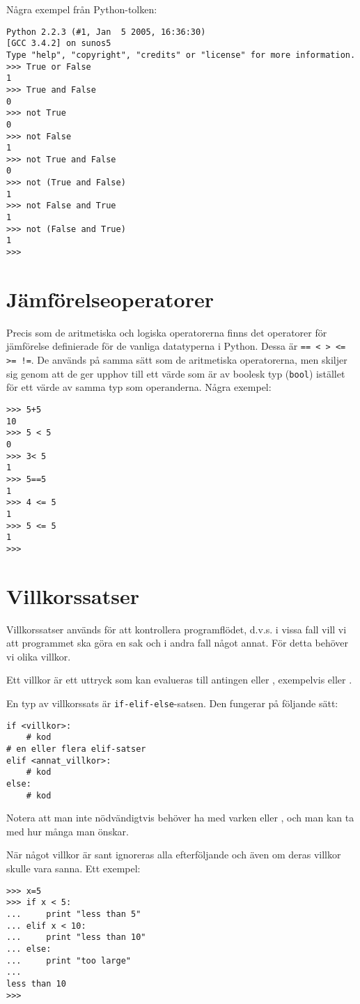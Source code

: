 Några exempel från Python-tolken:
\begin{lstlisting}[style=text]
Python 2.2.3 (#1, Jan  5 2005, 16:36:30)
[GCC 3.4.2] on sunos5
Type "help", "copyright", "credits" or "license" for more information.
>>> True or False
1
>>> True and False
0
>>> not True
0
>>> not False
1
>>> not True and False
0
>>> not (True and False)
1
>>> not False and True
1
>>> not (False and True)
1
>>>
\end{lstlisting}



\section{Jämförelseoperatorer}

Precis som de aritmetiska och logiska operatorerna finns det operatorer för
jämförelse definierade för de vanliga datatyperna i Python. Dessa är
\verb'== < > <= >= !='. De används på samma sätt som de aritmetiska
operatorerna, men skiljer sig genom att de ger upphov till ett värde som är av
boolesk typ (\verb'bool') istället för ett värde av samma typ som operanderna.
Några exempel:
\begin{lstlisting}[style=text]
>>> 5+5
10
>>> 5 < 5
0
>>> 3< 5
1
>>> 5==5
1
>>> 4 <= 5
1
>>> 5 <= 5
1
>>>
\end{lstlisting}



\section{Villkorssatser}

Villkorssatser används för att kontrollera programflödet, d.v.s. i vissa fall
vill vi att programmet ska göra en sak och i andra fall något annat. För detta
behöver vi olika villkor.

Ett villkor är ett uttryck som kan evalueras till antingen  eller
, exempelvis  eller .

En typ av villkorssats är \verb'if-elif-else'-satsen. Den fungerar på följande
sätt:
\begin{lstlisting}
if <villkor>:
    # kod
# en eller flera elif-satser
elif <annat_villkor>:
    # kod
else:
    # kod
\end{lstlisting}
Notera att man inte nödvändigtvis behöver ha med varken  eller
, och man kan ta med hur många  man önskar.

När något villkor är sant ignoreras alla efterföljande  och
 även om deras villkor skulle vara sanna. Ett exempel:
\begin{lstlisting}[style=text]
>>> x=5
>>> if x < 5:
...     print "less than 5"
... elif x < 10:
...     print "less than 10"
... else:
...     print "too large"
...
less than 10
>>>
\end{lstlisting}



